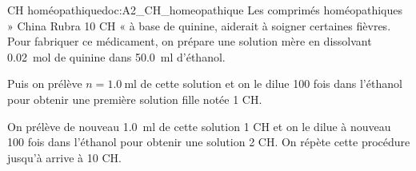 \begin{doc}{CH homéopathique}{doc:A2_CH_homeopathique}
  Les comprimés homéopathiques » China Rubra 10 CH « à base de quinine, aiderait à soigner certaines fièvres.
  Pour fabriquer ce médicament, on prépare une solution mère en dissolvant \qty{0,02}{\mole} de quinine %
  dans \qty{50,0}{\ml} d’éthanol.
  
  Puis on prélève $n = \qty{1,0}{\ml}$ de cette solution et on le dilue 100 fois dans l’éthanol pour obtenir une première solution fille notée 1 CH.
  
  On prélève de nouveau \qty{1,0}{\ml} de cette solution 1 CH et on le dilue à nouveau 100 fois dans l'éthanol pour obtenir une solution 2 CH.
  On répète cette procédure jusqu'à arrive à 10 CH.
\end{doc}



